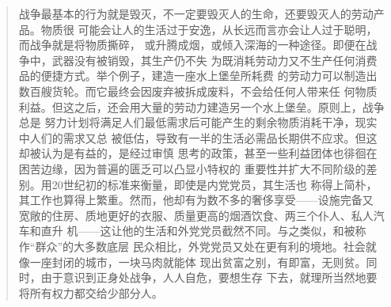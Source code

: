 \begin{paracol}{2}
\begin{quotation}
战争最基本的行为就是毁灭，不一定要毁灭人的生命，还要毁灭人的劳动产品。物质很
可能会让人的生活过于安逸，从长远而言亦会让人过于聪明，而战争就是将物质撕碎，
或升腾成烟，或倾入深海的一种途径。即便在战争中，武器没有被销毁，其生产仍不失
为既消耗劳动力又不生产任何消费品的便捷方式。举个例子，建造一座水上堡垒所耗费
的劳动力可以制造出数百艘货轮。而它最终会因废弃被拆成废料，不会给任何人带来任
何物质利益。但这之后，还会用大量的劳动力建造另一个水上堡垒。原则上，战争总是
努力计划将满足人们最低需求后可能产生的剩余物质消耗干净，现实中人们的需求又总
被低估，导致有一半的生活必需品长期供不应求。但这却被认为是有益的，是经过审慎
思考的政策，甚至一些利益团体也徘徊在困苦边缘，因为普遍的匮乏可以凸显小特权的
重要性并扩大不同阶级的差别。用20世纪初的标准来衡量，即使是内党党员，其生活也
称得上简朴，其工作也算得上繁重。然而，他却有为数不多的奢侈享受——设施完备又
宽敞的住房、质地更好的衣服、质量更高的烟酒饮食、两三个仆人、私人汽车和直升
机——这让他的生活和外党党员截然不同。与之类似，和被称作``群众''的大多数底层
民众相比，外党党员又处在更有利的境地。社会就像一座封闭的城市，一块马肉就能体
现出贫富之别，有即富，无则贫。同时，由于意识到正身处战争，人人自危，要想生存
下去，就理所当然地要将所有权力都交给少部分人。
\end{quotation}

\switchcolumn*


\end{paracol}
